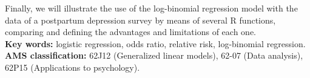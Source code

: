 \documentclass[twoside]{report}
\begin{document}
Finally, we will illustrate the use of the log-binomial regression model with the data of a postpartum depression survey by means of several R functions, comparing and defining the advantages and limitations of each one.\\

\textbf{Key words:} logistic regression, odds ratio, relative risk, log-binomial regression.\\

\textbf{AMS classification:} 62J12 (Generalized linear models), 62-07 (Data analysis), 62P15 (Applications to psychology).

\tableofcontents
\thispagestyle{empty}
\newpage
\listoftables
\begingroup
\let\clearpage\relax

\lstlistoflistings
{}

\endgroup












\end{document}
